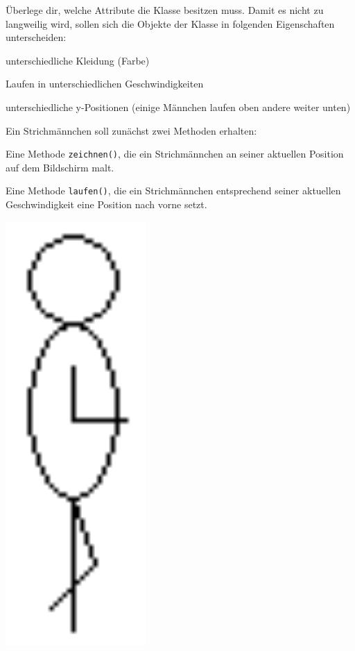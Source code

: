 \begin{compactenum}[a)]
\item Überlege dir, welche Attribute die Klasse 
besitzen muss. Damit es nicht zu langweilig wird, sollen sich die Objekte der
Klasse  in folgenden Eigenschaften unterscheiden:

\begin{minipage}{0.85\textwidth}
\begin{compactitem}
\item unterschiedliche Kleidung (Farbe)
\item Laufen in unterschiedlichen Geschwindigkeiten
\item unterschiedliche y-Positionen (einige Männchen laufen oben andere weiter
unten)
\end{compactitem}

Ein Strichmännchen soll zunächst zwei Methoden erhalten:

\begin{compactitem}
\item Eine Methode \lstinline|zeichnen()|, die ein Strichmännchen an seiner
aktuellen Position auf dem Bildschirm malt.
\item Eine Methode \lstinline|laufen()|, die ein Strichmännchen entsprechend
seiner aktuellen Geschwindigkeit eine Position nach vorne setzt.
\end{compactitem}
\end{minipage}
\begin{minipage}{0.15\textwidth}
\begin{center}
\includegraphics[width=0.4\textwidth]{./inf/SEKII/10_Java_Klassen/strichmaennchen.png}
\end{center}
\end{minipage}


\end{compactenum}
